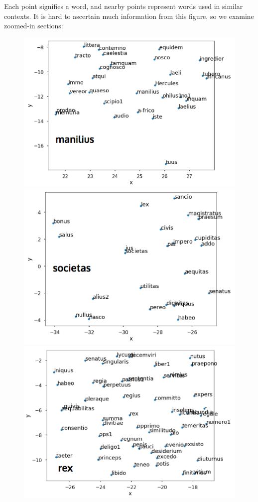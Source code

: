 \documentclass[a4paper, 12pt,notitlepage]{article} %
\newenvironment{figurecenter}{%
	\setlength\topsep{-7pt}
	\setlength\parskip{-7pt}
	\singlespacing %
	\begin{center}
	}{%
	\end{center}
\vspace{-5pt}
}
\numberwithin{dummy}{subsection}
\numberwithin{dummy}{section}
\theoremstyle{named}
\theoremstyle{definition}
\theoremstyle{definition}
\begin{document}
\noindent Each point signifies a word, and nearby points represent words used in similar contexts. It is hard to ascertain much information from this figure, so we examine zoomed-in sections:

\begin{figure}[H]
	\begin{figurecenter}
	\begin{minipage}{.5\textwidth}
		\centering
		\includegraphics[scale=0.55]{image9.png}
	\end{minipage}%
	\begin{minipage}{.5\textwidth}
		\centering
		\includegraphics[scale=0.55]{image10.png}
	\end{minipage}
\begin{minipage}{.5\textwidth}
	\centering
	\includegraphics[scale=0.55]{image11.png}

\end{minipage}
\end{figurecenter}
\end{figure}
\end{document}
